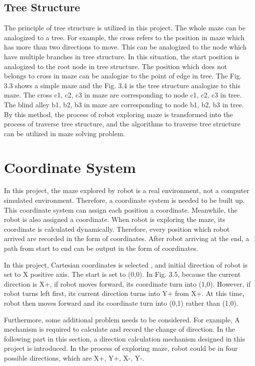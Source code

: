 \documentclass[11pt,times,oneside,openright,hardcopy]{eeereport}
\begin{document}
\subsection{Tree Structure}
The principle of tree structure is utilized in this project. The whole maze can be analogized to a tree. For example, the cross refers to the position in maze which has more than two directions to move. This can be analogized to the node which have multiple branches in tree structure. 
In this situation, the start position is analogized to the root node in tree structure. The position which does not belongs to cross in maze can be analogize to the point of edge in tree. The Fig. 3.3 shows a simple maze and the Fig. 3.4 is the tree structure analogize to this maze.
The cross c1, c2, c3 in maze are corresponding to node c1, c2, c3 in tree. The blind alley b1, b2, b3 in maze are corresponding to node b1, b2, b3 in tree.
By this method, the process of robot exploring maze is transformed into the process of traverse tree structure, and the algorithms to traverse tree structure can be utilized in maze solving problem. 


\section{Coordinate System}
In this project, the maze explored by robot is a real environment, not a computer simulated environment.
Therefore, a coordinate system is needed to be built up. This coordinate system can assign each position a coordinate.
Meanwhile, the robot is also assigned a coordinate. When robot is exploring the maze, its coordinate is calculated dynamically.
Therefore, every position which robot arrived are recorded in the form of coordinates. 
After robot arriving at the end, a path from start to end can be output in the form of coordinates.

In this project, Cartesian coordinates is selected \cite{GonzalezMartinez:2008fw}, and initial direction of robot is set to X positive axis.
The start is set to (0,0). In Fig. 3.5, because the current direction is X+, if robot moves forward, its coordinate turn into (1,0).
However, if robot turns left first, its current direction turns into Y+ from X+. At this time, robot then moves forward and its coordinate turn into (0,1) rather than (1,0).

Furthermore, some additional problem needs to be considered. For example, A mechanism is required to calculate and record the change of direction.
In the following part in this section, a direction calculation mechanism designed in this project is introduced.
In the process of exploring maze, robot could be in four possible directions, which are X+, Y+, X-, Y-. 
\end{document}
